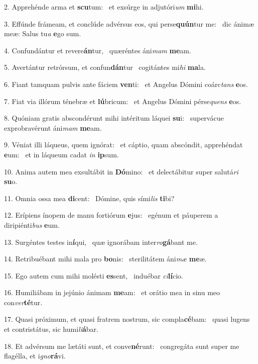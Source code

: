 2. Apprehénde arma et \textbf{scu}tum: \ast\  et exsúrge in adjutóri\textit{um} \textbf{mi}hi.\

3. Effúnde frámeam, et conclúde advérsus eos, qui perse\textbf{quún}tur me: \ast\  dic ánimæ meæ: Salus tu\textit{a} \textbf{e}go sum.\

4. Confundántur et revere\textbf{án}tur, \ast\  quæréntes áni\textit{mam} \textbf{me}am.\

5. Avertántur retrórsum, et confun\textbf{dán}tur \ast\  cogitántes mi\textit{hi} \textbf{ma}la.\

6. Fiant tamquam pulvis ante fáciem \textbf{ven}ti: \ast\  et Angelus Dómini coárc\textit{tans} \textbf{e}os.\

7. Fiat via illórum ténebræ et \textbf{lú}bricum: \ast\  et Angelus Dómini pérse\textit{quens} \textbf{e}os.\

8. Quóniam gratis abscondérunt mihi intéritum láquei \textbf{su}i: \ast\  supervácue exprobravérunt áni\textit{mam} \textbf{me}am.\

9. Véniat illi láqueus, quem ignórat: \dag\  et cáptio, quam abscóndit, apprehéndat \textbf{e}um: \ast\  et in láqueum cadat \textit{in} \textbf{ip}sum.\

10. Anima autem mea exsultábit in \textbf{Dó}mino: \ast\  et delectábitur super salutá\textit{ri} \textbf{su}o.\

11. Omnia ossa mea \textbf{di}cent: \ast\  Dómine, quis sími\textit{lis} \textbf{ti}bi?\

12. Erípiens ínopem de manu fortiórum \textbf{e}jus: \ast\  egénum et páuperem a diripiénti\textit{bus} \textbf{e}um.\

13. Surgéntes testes in\textbf{í}qui, \ast\  quæ ignorábam inter\textit{ro}\textbf{gá}bant me.\

14. Retribuébant mihi mala pro \textbf{bo}nis: \ast\  sterilitátem áni\textit{mæ} \textbf{me}æ.\

15. Ego autem cum mihi molésti \textbf{es}sent, \ast\  induébar \textit{ci}\textbf{lí}cio.\

16. Humiliábam in jejúnio ánimam \textbf{me}am: \ast\  et orátio mea in sinu meo con\textit{ver}\textbf{té}tur.\

17. Quasi próximum, et quasi fratrem nostrum, sic compla\textbf{cé}bam: \ast\  quasi lugens et contristátus, sic humi\textit{li}\textbf{á}bar.\

18. Et advérsum me lætáti sunt, et conve\textbf{né}runt: \ast\  congregáta sunt super me flagélla, et i\textit{gno}\textbf{rá}vi.\

